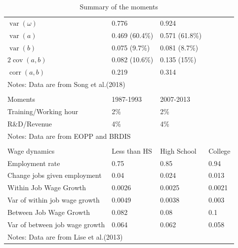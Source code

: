 \documentclass[12pt]{article}
\newcommand{\1}{\mathbb{1}}
\DeclareMathOperator{\var}{var}
\DeclareMathOperator{\cov}{cov}
\DeclareMathOperator{\corr}{corr}
\begin{document}
\begin{table}[h!]
\begin{tabular}{l|lll}
\hline 
$\var(\omega)$    & 0.776         & 0.924                             \\
$\var(a)$              & 0.469 (60.4\%) & 0.571 (61.8\%)   	\\
$\var(b)$             & 0.075 (9.7\%)   & 0.081 (8.7\%)             \\
$2\cov(a,b)$          & 0.082 (10.6\%)    & 0.135 (15\%)           	\\
$\corr(a,b)$        & 0.219  	& 0.314           						\\
\hline
\multicolumn{4}{l}{Notes: Data are from Song et al.(2018)\nocite{Songetal2018}} \\
\multicolumn{4}{c}{} \\
\hline \hline
Moments   &1987-1993     & 2007-2013      		\\
\hline 
Training/Working hour  & 2\% & 2\%  \\
R\&D/Revenue & 4\% & 4\% \\
\hline 
\multicolumn{4}{l}{Notes: Data are from EOPP and BRDIS} \\
\multicolumn{4}{c}{} \\
\hline \hline
Wage dynamics         & Less than HS & High School & College \\
\hline 
Employment rate                & 0.75                  & 0.85        & 0.94    \\
Change jobs given employment   & 0.04                  & 0.024       & 0.013   \\
Within Job Wage Growth        & 0.0026                & 0.0025      & 0.0021  \\
Var of within job wage growth & 0.0049                & 0.0038      & 0.003   \\
Between Job Wage Growth      & 0.082                 & 0.08        & 0.1     \\
Var of between job wage growth & 0.064                 & 0.062       & 0.058   \\
\hline 
\multicolumn{4}{l}{Notes: Data are from Lise et al.(2013)\nocite{Liseetal2013}} \\
\end{tabular}
\caption{Summary of the moments}
\label{Summary_moment}
\end{table}
\end{document}
